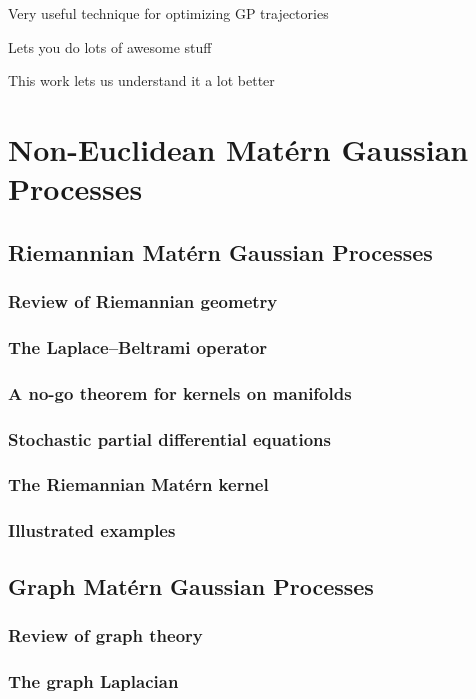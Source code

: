 \documentclass[11pt]{book}
\begin{document}
Very useful technique for optimizing GP trajectories

Lets you do lots of awesome stuff

This work lets us understand it a lot better





\chapter{Non-Euclidean Matérn Gaussian Processes}
\label{ch:noneuclidean}

\section{Riemannian Matérn Gaussian Processes}

\subsection{Review of Riemannian geometry}
\subsection{The Laplace--Beltrami operator}
\subsection{A no-go theorem for kernels on manifolds}
\subsection{Stochastic partial differential equations}
\subsection{The Riemannian Matérn kernel}
\subsection{Illustrated examples}

\section{Graph Matérn Gaussian Processes}

\subsection{Review of graph theory}
\subsection{The graph Laplacian}
\end{document}
